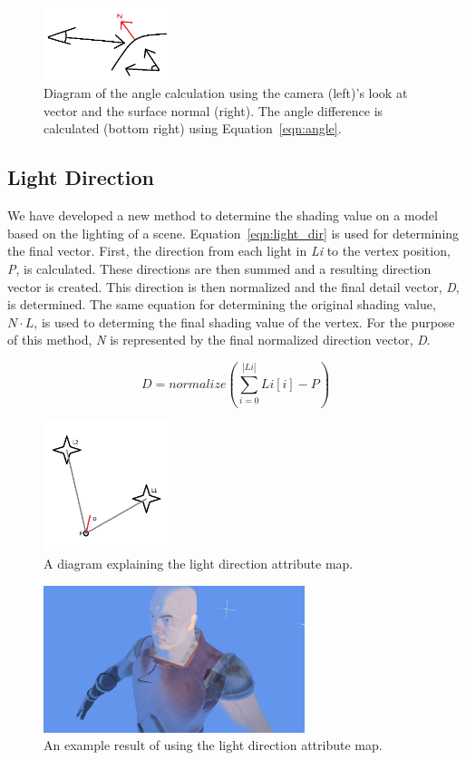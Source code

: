 \documentclass[annual]{acmsiggraph}
\begin{document}
\begin{figure}[h]
	\centering
	\includegraphics[width=1.5in]{images/angle}
	\caption{Diagram of the angle calculation using the camera (left)'s look at vector and the surface normal (right). The angle difference is calculated (bottom right) using Equation~\ref{eqn:angle}.}
	\label{fig:angle}
\end{figure}

\subsection{Light Direction}
We have developed a new method to determine the shading value on a model based on the lighting of a scene. Equation~\ref{eqn:light_dir} is used for determining the final vector. First, the direction from each light in {\it{Li}} to the vertex position, {\it{P}}, is calculated. These directions are then summed and a resulting direction vector is created. This direction is then normalized and the final detail vector, {\it{D}}, is determined. The same equation for determining the original shading value, $N\cdot L$, is used to determing the final shading value of the vertex. For the purpose of this method, {\it{N}} is represented by the final normalized direction vector, {\it{D}}. 

\begin{equation}
\label{eqn:light_dir}
D = normalize({\sum_{i=0}^{|Li|} Li[i] - P})
\end{equation}

\begin{figure}[h]
	\centering
	\includegraphics[width=1.5in]{images/light_detail}
	\caption{A diagram explaining the light direction attribute map.}
	\label{fig:lightDirection}
\end{figure}

\begin{figure}[h]
	\centering
	\includegraphics[width=3.0in]{images/light_directions}
	\caption{An example result of using the light direction attribute map.}
	\label{fig:lightDirectionResult}
\end{figure}
\end{document}
